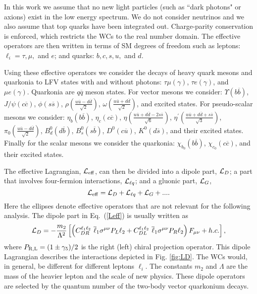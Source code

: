 \documentclass[12pt]{article}
\begin{document}
In this work we assume that no new light particles (such as ``dark photons" or axions) exist in the low energy spectrum.
We do not consider neutrinos and we also assume that top quarks have been integrated out.  Charge-parity conservation is 
enforced, which restricts the WCs to the real number domain.  The effective operators are then written in terms of SM 
degrees of freedom such as leptons: $\ell_i = \tau, \mu,$ and $e$; and quarks: $b, c, s, u,$ and $d$.

Using these effective operators we consider the decays of heavy quark mesons and quarkonia to LFV states with and without photons: 
$\tau \mu \left(\gamma \right)$,  $\tau e \left(\gamma \right)$, and  $\mu e \left(\gamma \right)$.  Quarkonia are 
$q \overline{q}$ meson states.  For vector mesons we consider: $\Upsilon ( b \overline{b})$, $J/\psi (c \overline{c})$, 
$\phi (s \overline{s})$, $\rho \left(\frac{u \overline{u} - d \overline{d}}{\sqrt{2}} \right)$, 
$\omega \left(\frac{u \overline{u} + d \overline{d}}{\sqrt{2}} \right)$, and excited states.  For pseudo-scalar mesons we consider: 
$\eta_b (b \overline{b})$, $\eta_c (c \overline{c})$, $\eta \left(\frac{u \overline{u} + d \overline{d} -2s \overline{s}}{\sqrt{6}} \right)$, 
$\eta^{\prime} \left(\frac{u \overline{u} + d \overline{d} + s \overline{s}}{\sqrt{3}} \right)$, 
$\pi_0 \left(\frac{u \overline{u} - d \overline{d}}{\sqrt{2}} \right)$, $B_d^0 (d \overline{b})$, $B_s^0 (s \overline{b})$, $D^0 (c \overline{u})$, 
$K^0 (d \overline{s})$, and their excited states.  Finally for the scalar mesons we consider the quarkonia: 
$\chi_{b_0} (b \overline{b})$, $\chi_{c_0} (c \overline{c})$, and their excited states.

The effective Lagrangian, ${\cal L}_{\rm eff}$, can then be divided into a dipole part, ${\cal L}_D$; 
a part that involves four-fermion interactions, ${\cal L}_{\ell q}$; and a gluonic part, ${\cal L}_{G}$, \cite{Hazard:2016fnc}  
%
\begin{equation}\label{Leff}
{\cal L}_{\rm eff}= {\cal L}_D + {\cal L}_{\ell q} + {\cal L}_{G} + ... .
\end{equation}
%
Here the ellipses denote effective operators that are not relevant for the following analysis. 
The dipole part in Eq.~(\ref{Leff}) is usually written as \cite{Celis:2014asa}
%
\begin{eqnarray}\label{LD}
{\cal L}_{D} = -\frac{m_2}{\Lambda^2} \left[
\left( 
C_{DR}^{\ell_1\ell_2} \ \overline \ell_1 \sigma^{\mu\nu} P_L \ell_2 + 
C_{DL}^{\ell_1\ell_2} \ \overline \ell_1 \sigma^{\mu\nu} P_R \ell_2 
\right) F_{\mu\nu} + h.c. \right],
\end{eqnarray}
% 
where $P_{\rm R,L}=(1\pm \gamma_5)/2$ is the right (left) chiral projection operator.  This dipole 
Lagrangian describes the interactions depicted in Fig. \ref{fig:LD}.  The WCs would, 
in general, be different for different leptons $\ell_i$. The constants $m_2$ and $\Lambda$ are the 
mass of the heavier lepton and the scale of new physics.  These dipole operators are selected by 
the quantum number of the two-body vector quarkonium decays.
\end{document}

